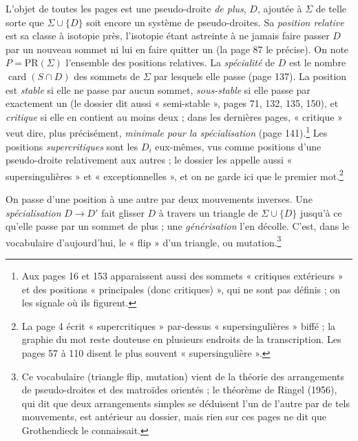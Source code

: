\documentclass[11pt,a4paper]{article}
\begin{document}
L'objet de toutes les pages est une pseudo-droite \emph{de plus}, $D$, ajoutée à
$\Sigma$ de telle sorte que $\Sigma \cup \lbrace D \rbrace$ soit encore un
système de pseudo-droites. Sa \emph{position relative} est sa classe à isotopie
près, l'isotopie étant astreinte à ne jamais faire passer $D$ par un nouveau
sommet ni lui en faire quitter un (la page 87 le précise). On note
$P = \mathrm{PR}(\Sigma)$ l'ensemble des positions relatives. La
\emph{spécialité} de $D$ est le nombre $\operatorname{card}(S \cap D)$ des
sommets de $\Sigma$ par lesquels elle passe (page 137). La position est
\emph{stable} si elle ne passe par aucun sommet, \emph{sous-stable} si elle
passe par exactement un (le dossier dit aussi « semi-stable », pages 71, 132,
135, 150), et \emph{critique} si elle en contient au moins deux ; dans les
dernières pages, « critique » veut dire, plus précisément, \emph{minimale pour
la spécialisation} (page 141).\footnote{Aux pages 16 et 153 apparaissent aussi
des sommets « critiques extérieurs » et des positions « principales (donc
critiques) », qui ne sont pas définis ; on les signale où ils figurent.} Les
positions \emph{supercritiques} sont les $D_i$ eux-mêmes, vus comme positions
d'une pseudo-droite relativement aux autres ; le dossier les appelle aussi
« supersingulières » et « exceptionnelles », et on ne garde ici que le premier
mot.\footnote{La page 4 écrit « supercritiques » par-dessus « supersingulières »
biffé ; la graphie du mot reste douteuse en plusieurs endroits de la
transcription. Les pages 57 à 110 disent le plus souvent « supersingulière ».}

On passe d'une position à une autre par deux mouvements inverses. Une
\emph{spécialisation} $D \to D'$ fait glisser $D$ à travers un triangle de
$\Sigma \cup \lbrace D \rbrace$ jusqu'à ce qu'elle passe par un sommet de plus ;
une \emph{générisation} l'en décolle. C'est, dans le vocabulaire d'aujourd'hui,
le « flip » d'un triangle, ou mutation.\footnote{Ce vocabulaire (triangle flip,
mutation) vient de la théorie des arrangements de pseudo-droites et des
matroïdes orientés ; le théorème de Ringel (1956), qui dit que deux
arrangements simples se déduisent l'un de l'autre par de tels mouvements, est
antérieur au dossier, mais rien sur ces pages ne dit que Grothendieck le
connaissait.}
\end{document}

